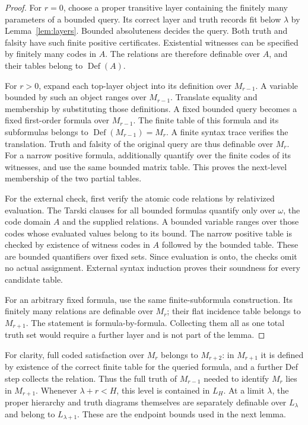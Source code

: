 \begin{proof}
For $r=0$, choose a proper transitive layer containing the finitely
many parameters of a bounded query. Its correct layer and truth records
fit below $\lambda$ by Lemma~\ref{lem:layers}. Bounded absoluteness
decides the query. Both truth and falsity have such finite positive
certificates. Existential witnesses can be specified by finitely many
codes in $A$. The relations are therefore definable over $A$, and their
tables belong to $\operatorname{Def}(A)$.

For $r>0$, expand each top-layer object into its definition over
$M_{r-1}$. A variable bounded by such an object ranges over $M_{r-1}$.
Translate equality and membership by substituting those definitions.
A fixed bounded query becomes a fixed first-order formula over
$M_{r-1}$. The finite table of this formula and its subformulas belongs
to $\operatorname{Def}(M_{r-1})=M_r$. A finite syntax trace verifies the
translation. Truth and falsity of the original query are thus definable
over $M_r$. For a narrow positive formula, additionally quantify over
the finite codes of its witnesses, and use the same bounded matrix
table. This proves the next-level membership of the two partial tables.

For the external check, first verify the atomic code relations by
relativized evaluation. The Tarski clauses for all bounded formulas
quantify only over $\omega$, the code domain $A$ and the supplied
relations. A bounded variable ranges over those codes whose evaluated
values belong to its bound. The narrow positive table is checked by
existence of witness codes in $A$ followed by the bounded table. These
are bounded quantifiers over fixed sets. Since evaluation is onto, the
checks omit no actual assignment. External syntax induction proves
their soundness for every candidate table.

For an arbitrary fixed formula, use the same finite-subformula
construction. Its finitely many relations are definable over $M_r$;
their flat incidence table belongs to $M_{r+1}$. The statement is
formula-by-formula. Collecting them all as one total truth set would
require a further layer and is not part of the lemma.
\end{proof}

For clarity, full coded satisfaction over $M_r$ belongs to $M_{r+2}$:
in $M_{r+1}$ it is defined by existence of the correct finite table
for the queried formula, and a further Def step collects the relation.
Thus the full truth of $M_{r-1}$ needed to identify $M_r$ lies in
$M_{r+1}$. Whenever $\lambda+r<H$, this level is contained in $L_H$.
At a limit $\lambda$, the proper hierarchy and truth diagrams themselves
are separately definable over $L_\lambda$ and belong to
$L_{\lambda+1}$. These are the endpoint bounds used in the next lemma.

